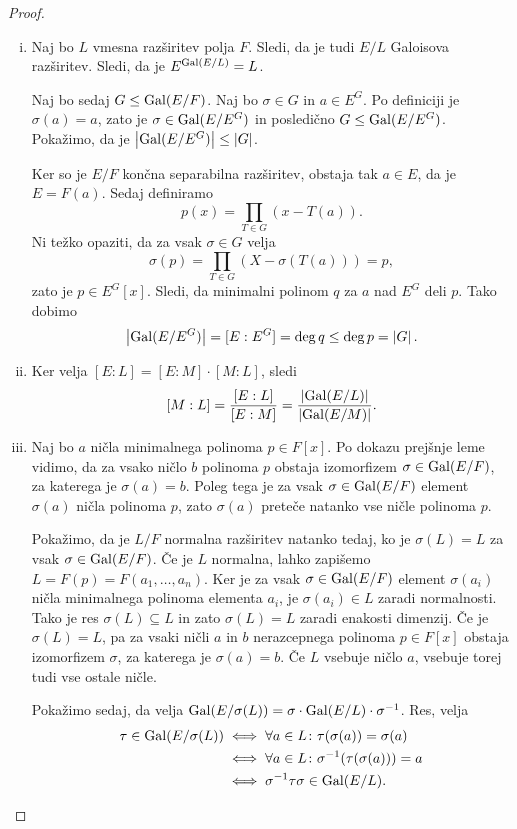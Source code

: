 \begin{proof}
\phantom{a}
\begin{enumerate}[i)]
\item Naj bo $L$ vmesna razširitev polja $F$. Sledi, da je tudi
$E/L$ Galoisova razširitev. Sledi, da je $E^{\operatorname{Gal}(E/L)} = L$.

Naj bo sedaj $G \leq \operatorname{Gal}(E/F)$. Naj bo $\sigma \in G$ in
$a \in E^G$. Po definiciji je $\sigma(a) = a$, zato je
$\sigma \in \operatorname{Gal}(E / E^G)$ in posledično $G \leq \operatorname{Gal}(E/E^G)$.
Pokažimo, da je $\left\lvert \operatorname{Gal}(E/E^G)\right\rvert \leq \left\lvert G\right\rvert$.

Ker so je $E/F$ končna separabilna razširitev, obstaja tak
$a \in E$, da je $E = F(a)$. Sedaj definiramo
\[
p(x) = \prod_{T \in G} (x - T(a)).
\]
Ni težko opaziti, da za vsak $\sigma \in G$ velja
\[
\sigma(p) = \prod_{T \in G} (X - \sigma(T(a))) = p,
\]
zato je $p \in E^G[x]$. Sledi, da minimalni polinom $q$ za $a$ nad
$E^G$ deli $p$. Tako dobimo
\[
\left\lvert \operatorname{Gal}(E/E^G)\right\rvert = [E : E^G] = \deg q \leq \deg p = \left\lvert G\right\rvert.
\]
\item Ker velja $[E : L] = [E : M] \cdot [M : L]$, sledi
\[
[M : L] = \frac{[E : L]}{[E : M]} =
\frac{\left\lvert \operatorname{Gal}(E/L)\right\rvert}{\left\lvert \operatorname{Gal}(E/M)\right\rvert}.
\]
\item Naj bo $a$ ničla minimalnega polinoma $p \in F[x]$. Po dokazu
prejšnje leme vidimo, da za vsako ničlo $b$ polinoma $p$ obstaja
izomorfizem $\sigma \in \operatorname{Gal}(E/F)$, za katerega je $\sigma(a) = b$.
Poleg tega je za vsak $\sigma \in \operatorname{Gal}(E/F)$ element $\sigma(a)$
ničla polinoma $p$, zato $\sigma(a)$ preteče natanko vse ničle
polinoma $p$.

Pokažimo, da je $L/F$ normalna razširitev natanko tedaj, ko je
$\sigma(L) = L$ za vsak $\sigma \in \operatorname{Gal}(E/F)$. Če je $L$ normalna,
lahko zapišemo $L = F(p) = F(a_1, \dots, a_n)$. Ker je za vsak
$\sigma \in \operatorname{Gal}(E/F)$ element $\sigma(a_i)$ ničla minimalnega
polinoma elementa $a_i$, je $\sigma(a_i) \in L$ zaradi normalnosti.
Tako je res $\sigma(L) \subseteq L$ in zato $\sigma(L) = L$ zaradi
enakosti dimenzij. Če je $\sigma(L) = L$, pa za vsaki ničli $a$ in
$b$ nerazcepnega polinoma $p \in F[x]$ obstaja izomorfizem
$\sigma$, za katerega je $\sigma(a) = b$. Če $L$ vsebuje ničlo $a$,
vsebuje torej tudi vse ostale ničle.

Pokažimo sedaj, da velja
$\operatorname{Gal}(E/\sigma(L)) = \sigma \cdot \operatorname{Gal}(E/L) \cdot \sigma^{-1}$.
Res, velja
\begin{align*}
\tau \in \operatorname{Gal}(E/\sigma(L)) &\iff
\forall a \in L \colon \tau(\sigma(a)) = \sigma(a)
\\
&\iff
\forall a \in L \colon \sigma^{-1}(\tau(\sigma(a))) = a
\\
&\iff
\sigma^{-1} \tau \sigma \in \operatorname{Gal}(E/L).
\end{align*}


\end{enumerate}
\end{proof}

